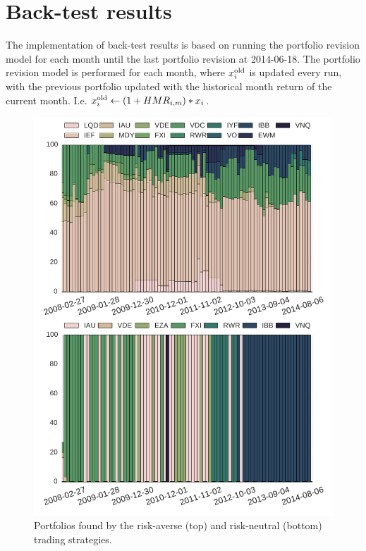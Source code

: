 \section{Back-test results}

The implementation of back-test results is based on running the portfolio revision model for each month until the last portfolio revision at 2014-06-18.
The portfolio revision model is performed for each month, where $x^{\textup{old}}_{i}$ is updated every run, with the previous portfolio updated with the historical month return of the current month.
I.e. $x_i^{\textup{old}} \leftarrow (1 + HMR_{i,m}) * x_i$.

\begin{figure}[tpb]
\centering
\includegraphics{../pic/trading_portfolio.pdf}
\caption{Portfolios found by the risk-averse (top) and risk-neutral (bottom) trading strategies.}
\label{fig:tradingportfolios}
\end{figure}

